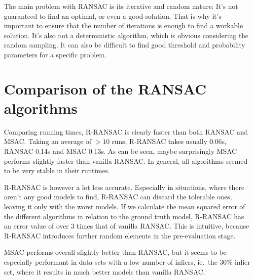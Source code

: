 The main problem with RANSAC is its iterative and random nature; It's not
guaranteed to find an optimal, or even a good solution. That is why it's
important to ensure that the number of iterations is enough to find a workable
solution. It's also not a deterministic algorithm, which is obvious considering
the random sampling.  It can also be difficult to find good threshold and
probability parameters for a specific problem.

\section{Comparison of the RANSAC algorithms}

Comparing running times, R-RANSAC is clearly faster than both RANSAC and MSAC\@.
Taking an average of \(>10\) runs, R-RANSAC takes usually 0.06s, RANSAC 0.14s and
MSAC 0.13s. As can be seen, maybe surprisingly MSAC performs slightly faster
than vanilla RANSAC\@. In general, all algorithms seemed to be very stable in
their runtimes.

R-RANSAC is however a lot less accurate. Especially in situations, where there
aren't any good models to find, R-RANSAC can discard the tolerable ones,
leaving it only with the worst models. If we calculate the mean squared error
of the different algorithms in relation to the ground truth model, R-RANSAC has
an error value of over 3 times that of vanilla RANSAC\@. This is intuitive,
because R-RANSAC introduces further random elements in the pre-evaluation
stage.

MSAC performs overall slightly better than RANSAC, but it seems to be
especially performant in data sets with a low number of inliers, ie.\ the 30\%
inlier set, where it results in much better models than vanilla RANSAC\@.







